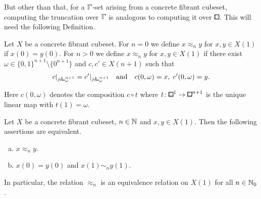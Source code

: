But other than that, for a $\bbGamma$-set arising from a concrete fibrant cubeset, computing the truncation over $\bbGamma$ is analogous to computing it over $\bbox$.
This will need the following Definition.

\begin{definition}
Let $X$ be a concrete fibrant cubeset.
For $n=0$ we define $x\approx_n y$ for $x,y\in X(1)$ if $x(0) = y(0)$.
For $n>0$ we define $x\approx_n y$ for $x,y\in X(1)$ if there exist $\omega\in\{0,1\}^{n+1}\setminus\{0^{n+1}\}$ and $c,c'\in X(n+1)$ such that
\[
    c\rvert_{j_!{\bbcor}^{n+1}_\omega} = c'\rvert_{j_!{\bbcor}^{n+1}_\omega} \quad\text{and}\quad c(0,\omega) = x,\; c'(0,\omega) = y.
\]
\end{definition}

Here $c(0,\omega)$ denotes the composition $c\circ t$ where $t\colon{\bblox}^1\to{\bblox}^{n+1}$ is the unique linear map with $t(1) = \omega$.

\begin{proposition}
Let $X$ be a concrete fibrant cubeset, $n\in{\mathbb{N}}$ and $x,y\in X(1)$.
Then the following assertions are equivalent.
\begin{enumerate}[(a)]
    \item $x\approx_n y$.
    \item $x(0) = y(0)$ and $x(1)\sim_n y(1)$.
\end{enumerate}
In particular, the relation $\approx_n$ is an equivalence relation on $X(1)$ for all $n\in{\mathbb{N}}_0$.
\end{proposition}


